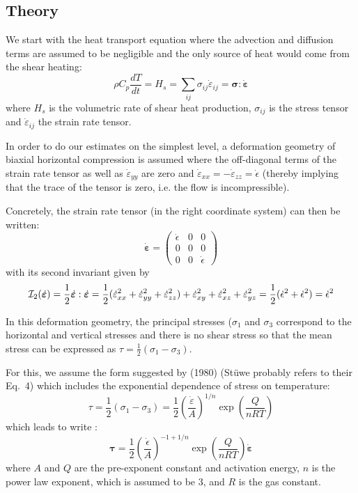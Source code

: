 \subsection*{Theory}

We start with the heat transport equation where the advection and diffusion terms 
are assumed to be negligible and the only source of heat would come from the shear heating:
\[
\rho C_p \frac{dT}{dt} = H_s = \sum_{ij}\sigma_{ij} \dot{\varepsilon}_{ij} = 
{\bm \sigma} : \dot{\bm \varepsilon}
\]
where $H_s$ is the volumetric rate of shear heat production, 
$\sigma_{ij}$ is the stress tensor and  $\dot{\varepsilon}_{ij}$ the strain rate tensor.

In order to do our estimates on the simplest level, a deformation
geometry of biaxial horizontal compression is assumed where the off-diagonal terms of the strain rate
tensor as well as $\dot{\varepsilon}_{yy}$ are zero and $\dot{\varepsilon}_{xx}=-\dot{\varepsilon}_{zz}
=\dot{\epsilon}$ (thereby implying that the trace of the tensor is zero, i.e. the flow
is incompressible).

Concretely, the strain rate tensor (in the right coordinate system) can then be written:
\[
\dot{\bm \varepsilon} = 
\left(
\begin{array}{ccc}
\dot\epsilon &0 & 0 \\
0 &0 & 0 \\
0 & 0 & \dot\epsilon
\end{array}
\right)
\]
with its second invariant given by
\[
{\cal I}_2(\dot{\bm \varepsilon}) 
= \frac12 \dot{\bm \varepsilon}:\dot{\bm \varepsilon}
= \frac12 (
\dot\varepsilon^2_{xx} + \dot\varepsilon^2_{yy} + \dot\varepsilon^2_{zz}
)+ 
\dot\varepsilon^2_{xy} + \dot\varepsilon^2_{xz} + \dot\varepsilon^2_{yz}
=\frac12 ( \dot\epsilon^2 + \dot\epsilon^2)
= \dot\epsilon^2
\]

In this deformation geometry, the principal stresses ($\sigma_1$ and $\sigma_3$ correspond 
to the horizontal and vertical stresses and there is no shear stress so that 
the mean stress can be expressed as $\tau = \frac12(\sigma_1-\sigma_3)$.

For this, we assume the form suggested by \textcite{brko80} (1980) 
(St\"uwe probably refers to their Eq.~4)
which includes the exponential dependence of stress on temperature:
\[
\tau = \frac{1}{2} (\sigma_1-\sigma_3) = \frac12 \left(\frac{\dot\varepsilon}{A} \right)^{1/n}
\exp \left( \frac{Q}{nRT} \right)
\]
which leads to write :
\[
{\bm \tau} = \frac12 \left(\frac{\dot\epsilon}{A} \right)^{-1+1/n}
\exp \left(\frac{Q}{nRT} \right) \dot{\bm \varepsilon}
\]
where $A$ and $Q$ are the pre-exponent constant and activation energy, $n$ is the power law exponent, 
which is assumed to be 3, and $R$ is the gas constant.


